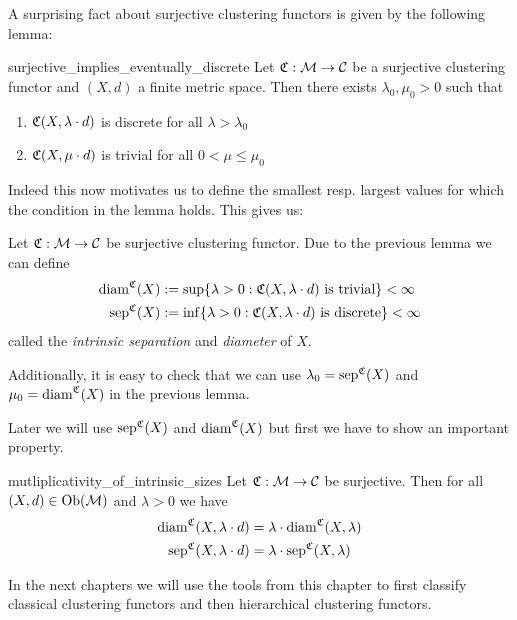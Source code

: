 A surprising fact about surjective clustering functors is given by the following lemma:

\begin{lemma}{}{surjective_implies_eventually_discrete}
Let $\mathfrak{C}: \mathcal{M} \to \mathcal{C}$ be a surjective clustering functor and $(X,d)$ a finite metric space. Then there exists $\lambda_0, \mu_0 > 0$ such that
\begin{enumerate}
    \item $\mathfrak{C}(X,\lambda \cdot d)$ is discrete for all $\lambda > \lambda_0$
    \item $\mathfrak{C}(X,\mu \cdot d)$ is trivial for all $0 < \mu \le \mu_0$
\end{enumerate}
\end{lemma}

Indeed this now motivates us to define the smallest resp. largest values for which the condition in the lemma holds. This gives us:

\begin{definition}{}{}
Let $\mathfrak{C}: \mathcal{M} \to \mathcal{C}$ be surjective clustering functor. Due to the previous lemma we can define
\begin{align*}
\mathrm{diam}^{\mathfrak{C}}(X) &:= \sup\{ \lambda > 0: \mathfrak{C}(X,\lambda \cdot d) \text{ is trivial}\} < \infty\\
\mathrm{sep}^{\mathfrak{C}}(X) &:= \inf\{ \lambda > 0: \mathfrak{C}(X,\lambda \cdot d) \text{ is discrete}\} < \infty
\end{align*}
called the \emph{intrinsic separation} and \emph{diameter} of $X$. 
\end{definition}
Additionally, it is easy to check that we can use $\lambda_0 = \mathrm{sep}^{\mathfrak{C}}(X)$ and $\mu_0 = \mathrm{diam}^{\mathfrak{C}}(X)$ in the previous lemma.

Later we will use $\mathrm{sep}^{\mathfrak{C}}(X)$ and $\mathrm{diam}^{\mathfrak{C}}(X)$ but first we have to show an important property.

\begin{lemma}{}{mutliplicativity_of_intrinsic_sizes}
Let $\mathfrak{C}: \mathcal{M} \to \mathcal{C}$ be surjective. Then for all $(X,d) \in \mathrm {Ob}(\mathcal{M})$ and $\lambda > 0$ we have
\begin{align*}{}{}
    \mathrm{diam}^{\mathfrak{C}}(X,\lambda \cdot d) &= \lambda \cdot \mathrm{diam}^{\mathfrak{C}}(X,\lambda) \\
    \mathrm{sep}^{\mathfrak{C}}(X,\lambda \cdot d) &= \lambda \cdot \mathrm{sep}^{\mathfrak{C}}(X,\lambda)
\end{align*}
 \end{lemma}

In the next chapters we will use the tools from this chapter to first classify classical clustering functors and then hierarchical clustering functors.